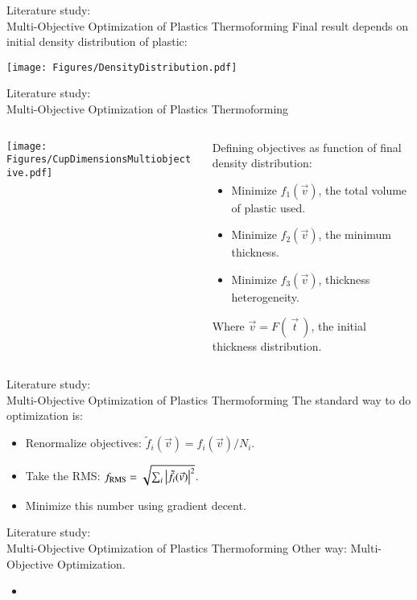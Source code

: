 \documentclass{beamer}
\begin{document}
	\begin{frame}{Literature study:\\ Multi-Objective Optimization of Plastics Thermoforming}
		Final result depends on initial density distribution of plastic:
		\begin{center}
			\texttt{[image: Figures/DensityDistribution.pdf]}
		\end{center}
	\end{frame}

	\begin{frame}{Literature study:\\ Multi-Objective Optimization of Plastics Thermoforming}
		\begin{columns}
			\begin{column}{0.5\textwidth}
				\texttt{[image: Figures/CupDimensionsMultiobjective.pdf]}
			\end{column}
			\begin{column}{0.5\textwidth}
				Defining objectives as function of final density distribution:
				\begin{itemize}
					\item Minimize $f_1(\vec v)$, the total volume of plastic used.
					\item Minimize $f_2(\vec v)$, the minimum thickness.
					\item Minimize $f_3(\vec v)$, thickness heterogeneity.
				\end{itemize}
				Where $\vec{v}=F(\:\vec t\:)$, the initial thickness distribution.
			\end{column}
		\end{columns}
	\end{frame}

	\begin{frame}{Literature study:\\ Multi-Objective Optimization of Plastics Thermoforming}
		The standard way to do optimization is:
		\begin{itemize}
			\item Renormalize objectives: $\tilde f_i(\vec v)=f_i(\vec v)/N_i$.
			\item Take the RMS: $f_{\text{RMS}}=\sqrt{\sum_{i}\abs{\tilde{f}_i(\vec{v})}^2}$.
			\item Minimize this number using gradient decent.
		\end{itemize}
	\end{frame}

	\begin{frame}{Literature study:\\ Multi-Objective Optimization of Plastics Thermoforming}
		Other way: Multi-Objective Optimization.
		\begin{itemize}
			\item 
		\end{itemize}
	\end{frame}

	\begin{frame}
		\printbibliography
	\end{frame}
\end{document}
